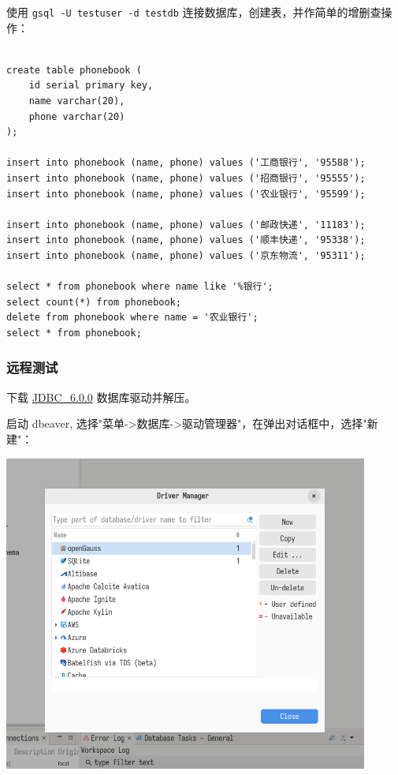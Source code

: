 \documentclass{article}
\begin{document}
使用 \verb|gsql -U testuser -d testdb| 连接数据库，创建表，并作简单的增删查操作：

\begin{verbatim}
  
create table phonebook (
    id serial primary key,
    name varchar(20),
    phone varchar(20)
);

insert into phonebook (name, phone) values ('工商银行', '95588');
insert into phonebook (name, phone) values ('招商银行', '95555');
insert into phonebook (name, phone) values ('农业银行', '95599');

insert into phonebook (name, phone) values ('邮政快递', '11183');
insert into phonebook (name, phone) values ('顺丰快递', '95338');
insert into phonebook (name, phone) values ('京东物流', '95311');

select * from phonebook where name like '%银行';
select count(*) from phonebook;
delete from phonebook where name = '农业银行';
select * from phonebook;

\end{verbatim}

\subsubsection{远程测试}

下载 \href{https://opengauss.org/zh/download/}{JDBC\_6.0.0} 数据库驱动并解压。

启动 dbeaver, 选择"菜单->数据库->驱动管理器"，在弹出对话框中，选择"新建"：

\begin{center}
\includegraphics[width=12cm]{./image/1.png}
\end{center}
\end{document}
